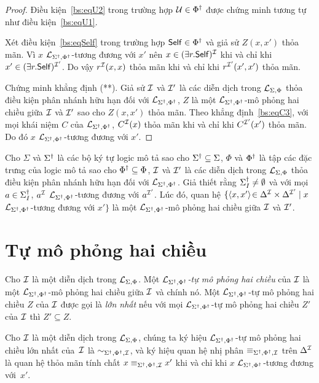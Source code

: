\begin{proof}
	\semiItem Điều kiện~\eqref{bs:eqU2} trong trường hợp $\mathcal{U} \in \Phi^\dag$ được chứng minh tương tự như điều kiện~\eqref{bs:eqU1}.
	
	\semiItem Xét điều kiện~\eqref{bs:eqSelf} trong trường hợp $\mathsf{Self} \in \Phi^\dag$ và giả sử $Z(x,x')$ thỏa mãn. Vì $x$ $\mathcal{L}_{\Sigma^\dag,\Phi^\dag}$-tương đương với $x'$ nên $x \in (\exists r.\mathsf{Self})^{\mathcal{I}}$ khi và chỉ khi $x' \in (\exists r.\mathsf{Self})^{\mathcal{I}'}$. Do vậy $r^{\mathcal{I}}(x,x)$ thỏa mãn khi và chỉ khi $r^{\mathcal{I}'}(x',x')$ thỏa mãn.
	
	Chứng minh khẳng định (**). Giả sử $\mathcal{I}$ và $\mathcal{I}'$ là các diễn dịch trong $\mathcal{L}_{\Sigma,\Phi}$ thỏa điều kiện phân nhánh hữu hạn đối với $\mathcal{L}_{\Sigma^\dag,\Phi^\dag}$, $Z$ là một $\mathcal{L}_{\Sigma^\dag,\Phi^\dag}$-mô phỏng hai chiều giữa $\mathcal{I}$ và $\mathcal{I}'$ sao cho $Z(x,x')$ thỏa mãn. Theo khẳng định~\eqref{bs:eqC3}, với mọi khái niệm $C$ của $\mathcal{L}_{\Sigma^\dag,\Phi^\dag}$, $C^{\mathcal{I}}(x)$ thỏa mãn khi và chỉ khi $C^{\mathcal{I}'}(x')$ thỏa mãn. Do đó $x$ $\mathcal{L}_{\Sigma^\dag,\Phi^\dag}$-tương đương với $x'$.
\end{proof}

\begin{Corollary}
\label{co:EquivalenceRelation}
	Cho $\Sigma$ và $\Sigma^\dag$ là các bộ ký tự logic mô tả sao cho $\Sigma^\dag \subseteq \Sigma$, $\Phi$ và $\Phi^\dag$ là tập các đặc trưng của logic mô tả sao cho $\Phi^\dag \subseteq \Phi$, $\mathcal{I}$ và $\mathcal{I}'$ là các diễn dịch trong $\mathcal{L}_{\Sigma,\Phi}$ thỏa điều kiện phân nhánh hữu hạn đối với $\mathcal{L}_{\Sigma^\dag,\Phi^\dag}$. Giả thiết rằng $\Sigma^\dag_I \not= \emptyset$ và với mọi $a \in \Sigma^\dag_I$, $a^{\mathcal{I}}$ $\mathcal{L}_{\Sigma^\dag,\Phi^\dag}$-tương đương với $a^{\mathcal{I}'}$.
	Lúc đó, quan hệ $\{\left\langle x, x'\right\rangle\! \in \Delta^{\mathcal{I}} \times \Delta^{\mathcal{I}'} \mid x $ $\mathcal{L}_{\Sigma^\dag,\Phi^\dag}$-tương đương với $x'\}$ là một $\mathcal{L}_{\Sigma^\dag,\Phi^\dag}$-mô phỏng hai chiều giữa $\mathcal{I}$ và $\mathcal{I}'$.\myend
\end{Corollary}

\section{Tự mô phỏng hai chiều}
\label{sec:Chap2.AutoBisimulation}

\begin{Definition}
\label{def:AutoBisimulation}
	Cho $\mathcal{I}$ là một diễn dịch trong $\mathcal{L}_{\Sigma,\Phi}$. Một {\em $\mathcal{L}_{\Sigma^\dag,\Phi^\dag}$-tự mô phỏng hai chiều} của $\mathcal{I}$ là một $\mathcal{L}_{\Sigma^\dag,\Phi^\dag}$-mô phỏng hai chiều giữa $\mathcal{I}$ và chính nó. Một $\mathcal{L}_{\Sigma^\dag,\Phi^\dag}$-tự mô phỏng hai chiều $Z$ của $\mathcal{I}$ được gọi là {\em lớn nhất} nếu với mọi $\mathcal{L}_{\Sigma^\dag,\Phi^\dag}$-tự mô phỏng hai chiều $Z'$ của $\mathcal{I}$ thì $Z' \subseteq Z$.\myend
\end{Definition}

Cho $\mathcal{I}$ là một diễn dịch trong $\mathcal{L}_{\Sigma,\Phi}$, chúng ta ký hiệu $\mathcal{L}_{\Sigma^\dag,\Phi^\dag}$-tự mô phỏng hai chiều lớn nhất của~$\mathcal{I}$ là $\sim_{\Sigma^\dag,\Phi^\dag,\mathcal{I}}$, và ký hiệu quan hệ nhị phân $\equiv_{\Sigma^\dag,\Phi^\dag,\mathcal{I}}$ trên $\Delta^{\mathcal{I}}$ là quan hệ thỏa mãn tính chất $x \equiv_{\Sigma^\dag,\Phi^\dag,\mathcal{I}} x'$ khi và chỉ khi $x$ $\mathcal{L}_{\Sigma^\dag,\Phi^\dag}$-tương đương với~$x'$.

